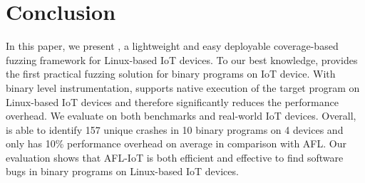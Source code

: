 \section{Conclusion}\label{sec:con}

In this paper, we present \sysname, a lightweight and easy deployable coverage-based fuzzing framework for Linux-based IoT devices. To our best knowledge, \sysname provides the first practical fuzzing solution for binary programs on IoT device. With binary level instrumentation, \sysname supports native execution of the target program on Linux-based IoT devices and therefore significantly reduces the performance overhead. We evaluate \sysname on both benchmarks and real-world IoT devices. Overall, \sysname is able to identify 157 unique crashes in 10 binary programs on 4 devices and only has 10\% performance overhead on average in comparison with AFL. Our evaluation shows that AFL-IoT is both efficient and effective to find software bugs in binary programs on Linux-based IoT devices.